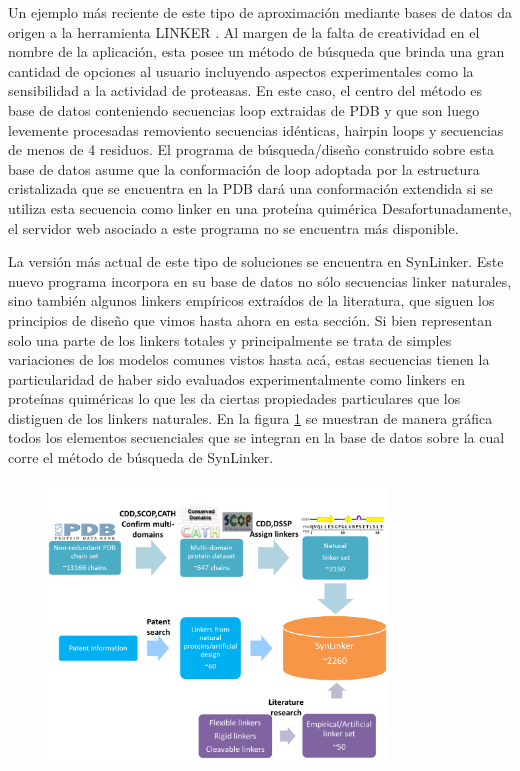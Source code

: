 
Un ejemplo más reciente de este tipo de aproximación mediante bases de datos da origen a la herramienta LINKER \cite{crasto2000linker,xue2004linker}.
Al margen de la falta de creatividad en el nombre de la aplicación, esta posee un método de búsqueda que brinda una gran cantidad de opciones al usuario incluyendo aspectos experimentales como la sensibilidad a la actividad de proteasas.
En este caso, el centro del método es base de datos conteniendo secuencias loop extraidas de PDB y que son luego levemente procesadas removiento secuencias idénticas, hairpin loops y secuencias de menos de 4 residuos. 
El programa de búsqueda/diseño construido sobre esta base de datos asume que la conformación de loop adoptada por la estructura cristalizada que se encuentra en la PDB dará una conformación extendida 
si se utiliza esta secuencia como linker en una proteína quimérica
Desafortunadamente, el servidor web asociado a este programa no se encuentra más disponible.



La versión más actual de este tipo de soluciones se encuentra en SynLinker\cite{liu2015synlinker}. 
Este nuevo programa incorpora en su base de datos no sólo secuencias linker naturales, sino también algunos linkers empíricos extraídos de la literatura, 
que siguen los principios de diseño que vimos hasta ahora en esta sección. Si bien representan solo una parte de los linkers totales y principalmente se trata de simples variaciones de los modelos comunes vistos hasta acá,
estas secuencias tienen la particularidad de haber sido evaluados experimentalmente como linkers en proteínas quiméricas lo que les da ciertas propiedades particulares que los distiguen de los linkers naturales.
En la figura \ref{SynLinker} se muestran de manera gráfica todos los elementos secuenciales que se integran en la base de datos sobre la cual corre el método de búsqueda de SynLinker.

\begin{figure}[htbp,centered]
\centering
\includegraphics[width=0.8\textwidth]{img/synLink.png} 
\caption{ } 
\label{SynLinker}
\end{figure}




